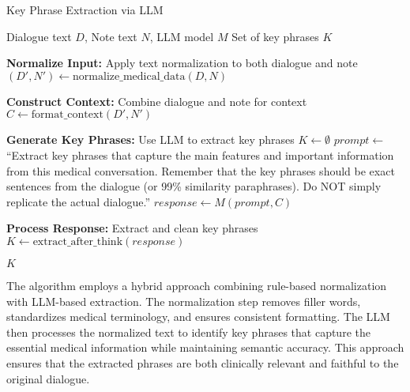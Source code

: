 \documentclass[11pt,a4paper]{article}
\begin{document}
\begin{algorithm}[H]
\caption{Key Phrase Extraction via LLM}
\label{alg:key_phrase_extraction}
\begin{algorithmic}[1]
\Require Dialogue text $D$, Note text $N$, LLM model $M$
\Ensure Set of key phrases $K$

\State \textbf{Normalize Input:} Apply text normalization to both dialogue and note
\State $(D', N') \gets \mathrm{normalize\_medical\_data}(D, N)$

\State \textbf{Construct Context:} Combine dialogue and note for context
\State $C \gets \mathrm{format\_context}(D', N')$

\State \textbf{Generate Key Phrases:} Use LLM to extract key phrases
\State $K \gets \emptyset$
\State $prompt \gets$ ``Extract key phrases that capture the main features and important information from this medical conversation. Remember that the key phrases should be exact sentences from the dialogue (or 99\% similarity paraphrases). Do NOT simply replicate the actual dialogue.''
\State $response \gets M(prompt, C)$

\State \textbf{Process Response:} Extract and clean key phrases
\State $K \gets \mathrm{extract\_after\_think}(response)$

\Return $K$

\end{algorithmic}
\end{algorithm}

The algorithm employs a hybrid approach combining rule-based normalization with LLM-based extraction. The normalization step removes filler words, standardizes medical terminology, and ensures consistent formatting. The LLM then processes the normalized text to identify key phrases that capture the essential medical information while maintaining semantic accuracy. This approach ensures that the extracted phrases are both clinically relevant and faithful to the original dialogue.
\end{document}
